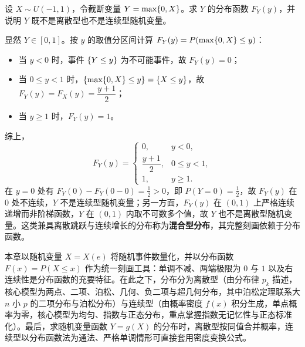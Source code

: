 \begin{example}[title={既非离散又非连续的混合型随机变量}]
\label{eg:mixed-rv}
设 $X\sim U(-1,1)$，令截断变量 $Y=\max\{0,X\}$。求 $Y$ 的分布函数 $F_Y(y)$，并说明 $Y$ 既不是离散型也不是连续型随机变量。
\begin{solution}
显然 $Y\in[0,1]$。按 $y$ 的取值分区间计算 $F_Y(y)=P(\max\{0,X\}\le y)$：
\begin{itemize}
  \item 当 $y<0$ 时，事件 $\{Y\le y\}$ 为不可能事件，故 $F_Y(y)=0$；
  \item 当 $0\le y<1$ 时，$\{\max\{0,X\}\le y\}=\{X\le y\}$，故 $F_Y(y)=F_X(y)=\dfrac{y+1}{2}$；
  \item 当 $y\ge 1$ 时，$F_Y(y)=1$。
\end{itemize}
综上，
\[
  F_Y(y)=
  \begin{cases}
    0,& y<0,\\
    \dfrac{y+1}{2},& 0\le y<1,\\
    1,& y\ge 1.
  \end{cases}
\]
在 $y=0$ 处有 $F_Y(0)-F_Y(0-0)=\frac{1}{2}>0$，即 $P(Y=0)=\frac{1}{2}$，故 $F_Y(y)$ 在 $0$ 处不连续，$Y$ 不是连续型随机变量；另一方面，$F_Y(y)$ 在 $(0,1)$ 上严格连续递增而非阶梯函数，$Y$ 在 $(0,1)$ 内取不可数多个值，故 $Y$ 也不是离散型随机变量。这类兼具离散跳跃与连续增长的分布称为\textbf{混合型分布}，其完整刻画依赖于分布函数。
\end{solution}
\end{example}

\begin{summary}[第二章核心脉络]
本章以随机变量 $X=X(e)$ 将随机事件数量化，并以分布函数 $F(x)=P(X\le x)$ 作为统一刻画工具：单调不减、两端极限为 $0$ 与 $1$ 以及右连续性是分布函数的充要特征。在此之下，分布分为离散型（由分布律 $p_k$ 描述，核心模型为两点、二项、泊松、几何、负二项与超几何分布，其中泊松定理联系大 $n$ 小 $p$ 的二项分布与泊松分布）与连续型（由概率密度 $f(x)$ 积分生成，单点概率为零，核心模型为均匀、指数与正态分布，重点掌握指数无记忆性与正态标准化）。最后，求随机变量函数 $Y=g(X)$ 的分布时，离散型按同值合并概率，连续型以分布函数法为通法、严格单调情形可直接套用密度变换公式。
\end{summary}
